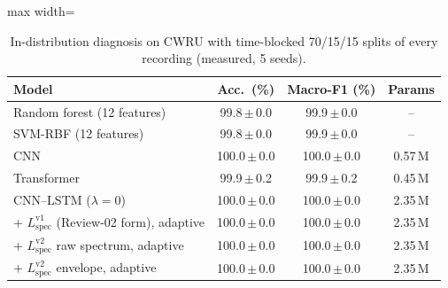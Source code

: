 \documentclass[conference]{IEEEtran}
\begin{document}
\begin{table}[t]
\caption{In-distribution diagnosis on CWRU with time-blocked 70/15/15 splits of every recording (measured, 5 seeds).}
\label{tab:indist}
\centering
\footnotesize
\begin{adjustbox}{max width=\columnwidth}
\begin{tabular}{lccc}
\toprule
Model & Acc.\ (\%) & Macro-F1 (\%) & Params \\
\midrule
Random forest (12 features) & 99.8\,$\pm$\,0.0 & 99.9\,$\pm$\,0.0 & -- \\
SVM-RBF (12 features) & 99.8\,$\pm$\,0.0 & 99.9\,$\pm$\,0.0 & -- \\
CNN & 100.0\,$\pm$\,0.0 & 100.0\,$\pm$\,0.0 & 0.57\,M \\
Transformer & 99.9\,$\pm$\,0.2 & 99.9\,$\pm$\,0.2 & 0.45\,M \\
CNN--LSTM ($\lambda=0$) & 100.0\,$\pm$\,0.0 & 100.0\,$\pm$\,0.0 & 2.35\,M \\
\midrule
+ $L_{\mathrm{spec}}^{\mathrm{v1}}$ (Review-02 form), adaptive & 100.0\,$\pm$\,0.0 & 100.0\,$\pm$\,0.0 & 2.35\,M \\
+ $L_{\mathrm{spec}}^{\mathrm{v2}}$ raw spectrum, adaptive & 100.0\,$\pm$\,0.0 & 100.0\,$\pm$\,0.0 & 2.35\,M \\
+ $L_{\mathrm{spec}}^{\mathrm{v2}}$ envelope, adaptive & 100.0\,$\pm$\,0.0 & 100.0\,$\pm$\,0.0 & 2.35\,M \\
\bottomrule
\end{tabular}
\end{adjustbox}
\end{table}
\end{document}
